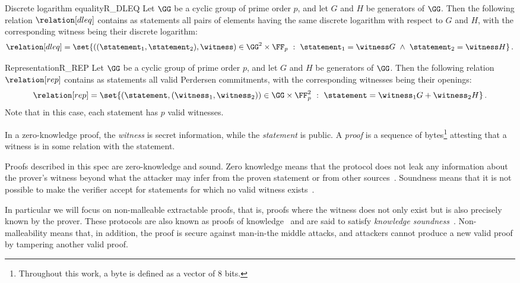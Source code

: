 \documentclass[11pt]{article}
\begin{document}
\begin{example}{Discrete logarithm equality}{R_DLEQ}
  Let $\GG$ be a cyclic group of prime order $p$, and let $G$ and $H$ be generators of $\GG$.
	Then the following relation $\relation[dleq]$ contains as statements all pairs of elements having the same discrete logarithm with respect to $G$ and $H$, with the corresponding witness being their discrete logarithm:
  \[
	  \relation[dleq] = \set{\left((\statement_1,\statement_2),\witness\right) \in \GG^2\times \FF_p~:~\statement_1=\witness G ~\land~ \statement_2=\witness H}\,.
	\]
\end{example}

\begin{example}{Representation}{R_REP}
  Let $\GG$ be a cyclic group of prime order $p$, and let $G$ and $H$ be generators of $\GG$.
	Then the following relation $\relation[rep]$ contains as statements all valid Perdersen commitments, with the corresponding witnesses being their openings:
  \[
	  \relation[rep] = \set{\left(\statement,(\witness_1,\witness_2)\right)\in \GG \times \FF_p^2~:~\statement=\witness_1G + \witness_2H}\,.
	\]
	Note that in this case, each statement has $p$ valid witnesses.
\end{example}

In a zero-knowledge proof, the \emph{witness} is secret information, while the \emph{statement} is public.
A \emph{proof} is a sequence of bytes\footnote{Throughout this work, a byte is defined as a vector of 8 bits.} attesting that a witness is in some relation with the statement.

Proofs described in this spec are zero-knowledge and sound.
Zero knowledge means that the protocol does not leak any information about the prover's witness beyond what the attacker may infer from the proven statement or from other sources~\cite[1.6.4]{zkproof-reference}.
Soundness means that it is not possible to make the verifier accept for statements for which no valid witness exists~\cite[1.6.2]{zkproof-reference}.

In particular we will focus on non-malleable extractable proofs, that is, proofs where the witness does not only exist but is also precisely known by the prover.
These protocols are also known as proofs of knowledge~\cite{STOC:GolMicRac85,STOC:FeiFiaSha87,C:BelGol92} and are said to satisfy \emph{knowledge soundness}~\cite{damgard04}. Non-malleability means that, in addition, the proof is secure against man-in-the middle attacks, and attackers cannot produce a new valid proof by tampering
another valid proof.
\end{document}
